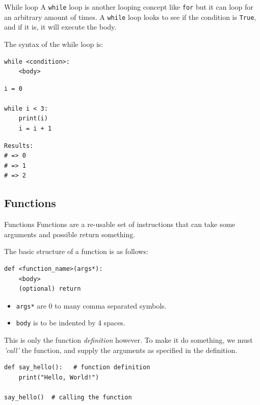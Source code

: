 \documentclass[10pt]{beamer}
\begin{document}
\begin{frame}[label={sec:org655b4e7},fragile]{While loop}
 A \texttt{while} loop is another looping concept like \texttt{for} but it can loop for an arbitrary
amount of times. A \texttt{while} loop looks to see if the condition is \texttt{True}, and if it is, it
will execute the body.

The syntax of the while loop is:

\begin{verbatim}
while <condition>:
    <body>
\end{verbatim}

\begin{verbatim}
i = 0

while i < 3:
    print(i)
    i = i + 1
\end{verbatim}

\begin{verbatim}
Results: 
# => 0
# => 1
# => 2
\end{verbatim}
\end{frame}

\subsection{Functions}
\label{sec:org9a46883}
\begin{frame}[label={sec:org967cf54},fragile]{Functions}
 Functions are a re-usable set of instructions that can take some arguments and
possible return something.

The basic structure of a function is as follows:

\begin{verbatim}
def <function_name>(args*):
    <body>
    (optional) return
\end{verbatim}

\begin{itemize}
\item \texttt{args*} are 0 to many comma separated symbols.
\item \texttt{body} is to be indented by 4 spaces.
\end{itemize}

This is only the function \emph{definition} however. To make it do something, we must \emph{'call'}
the function, and supply the arguments as specified in the definition.

\begin{verbatim}
def say_hello():   # function definition
    print("Hello, World!")

say_hello()  # calling the function
\end{verbatim}
\end{frame}
\end{document}
